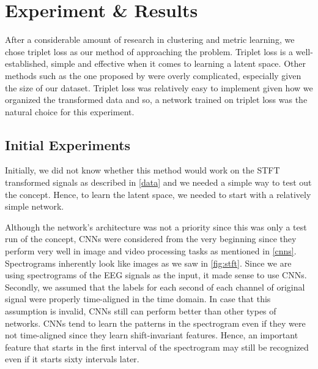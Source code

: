 \chapter{Experiment \& Results}
\label{expres}

After a considerable amount of research in clustering and metric learning, we chose triplet loss as our method of approaching the problem. Triplet loss is a  well-established, simple and effective when it comes to learning a latent space. Other methods such as the one proposed by \citet{lifted_structure_embedding} were overly complicated, especially given the size of our dataset. Triplet loss was relatively easy to implement given how we organized the transformed data and so, a network trained on triplet loss was the natural choice for this experiment. 

\section{Initial Experiments}

Initially, we did not know whether this method would work on the STFT transformed signals as described in \cref{data} and we needed a simple way to test out the concept. Hence, to learn the latent space, we needed to start with a relatively simple network. 

Although the network's architecture was not a priority since this was only a test run of the concept, CNNs were considered from the very beginning since they perform very well in image and video processing tasks as mentioned in \cref{cnns}. Spectrograms inherently look like images as we saw in \cref{fig:stft}. Since we are using spectrograms of the EEG signals as the input, it made sense to use CNNs. Secondly, we assumed that the labels for each second of each channel of original signal were properly time-aligned in the time domain. In case that this assumption is invalid, CNNs still can perform better than other types of networks. CNNs tend to learn the patterns in the spectrogram even if they were not time-aligned since they learn shift-invariant features. Hence, an important feature that starts in the first interval of the spectrogram may still be recognized even if it starts sixty intervals later.

